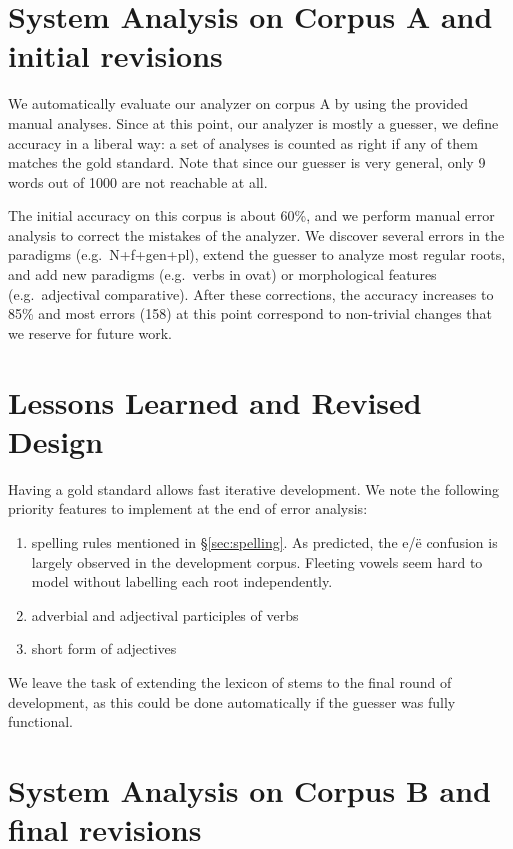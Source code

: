 \documentclass[11pt,letterpaper]{article}
\newcommand\textcyr[1]{{\fontencoding{OT2}\fontfamily{wncyr}\selectfont #1}}
\begin{document}
\section{System Analysis on Corpus A and initial revisions}

We automatically evaluate our analyzer on corpus A by using the provided manual analyses. Since at this point, our analyzer is mostly a guesser, we define accuracy in a liberal way: a set of analyses is counted as right if any of them matches the gold standard. Note that since our guesser is very general, only 9 words out of 1000 are not reachable at all.

The initial accuracy on this corpus is about 60\%, and we perform manual error analysis to correct the mistakes of the analyzer. We discover several errors in the paradigms (e.g.~N+f+gen+pl), extend the guesser to analyze most regular roots, and add new paradigms (e.g.~verbs in \textcyr{ovat\cyrsftsn}) or morphological features (e.g.~adjectival comparative). After these corrections, the accuracy increases to 85\% and most errors (158) at this point correspond to non-trivial changes that we reserve for future work.

\section{Lessons Learned and Revised Design}

Having a gold standard allows fast iterative development. We note the following priority features to implement at the end of error analysis:
\begin{enumerate}
  \item spelling rules mentioned in \S\ref{sec:spelling}. As predicted, the \textcyr{e}/\textcyr{\"e} confusion is largely observed in the development corpus. Fleeting vowels seem hard to model without labelling each root independently.
  \item adverbial and adjectival participles of verbs
  \item short form of adjectives
\end{enumerate}
We leave the task of extending the lexicon of stems to the final round of development, as this could be done automatically if the guesser was fully functional.

\section{System Analysis on Corpus B and final revisions}
\end{document}

